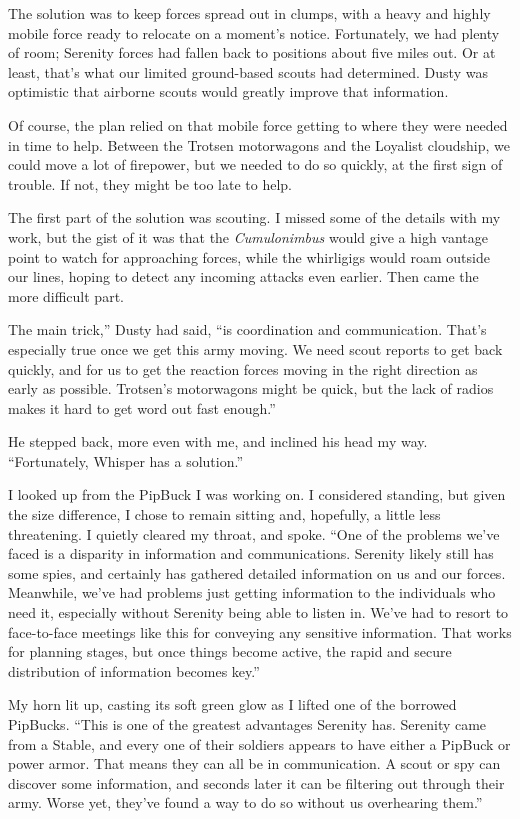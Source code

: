 The solution was to keep forces spread out in clumps, with a heavy and highly mobile force ready to relocate on a moment’s notice. Fortunately, we had plenty of room; Serenity forces had fallen back to positions about five miles out. Or at least, that’s what our limited ground-based scouts had determined. Dusty was optimistic that airborne scouts would greatly improve that information.

Of course, the plan relied on that mobile force getting to where they were needed in time to help. Between the Trotsen motorwagons and the Loyalist cloudship, we could move a lot of firepower, but we needed to do so quickly, at the first sign of trouble. If not, they might be too late to help.

The first part of the solution was scouting. I missed some of the details with my work, but the gist of it was that the \textit{Cumulonimbus} would give a high vantage point to watch for approaching forces, while the whirligigs would roam outside our lines, hoping to detect any incoming attacks even earlier. Then came the more difficult part.

\leavevmode{}The main trick,” Dusty had said, “is coordination and communication. That’s especially true once we get this army moving. We need scout reports to get back quickly, and for us to get the reaction forces moving in the right direction as early as possible. Trotsen’s motorwagons might be quick, but the lack of radios makes it hard to get word out fast enough.”

He stepped back, more even with me, and inclined his head my way. “Fortunately, Whisper has a solution.”

I looked up from the PipBuck I was working on. I considered standing, but given the size difference, I chose to remain sitting and, hopefully, a little less threatening. I quietly cleared my throat, and spoke. “One of the problems we’ve faced is a disparity in information and communications. Serenity likely still has some spies, and certainly has gathered detailed information on us and our forces. Meanwhile, we’ve had problems just getting information to the individuals who need it, especially without Serenity being able to listen in. We’ve had to resort to face-to-face meetings like this for conveying any sensitive information. That works for planning stages, but once things become active, the rapid and secure distribution of information becomes key.”

My horn lit up, casting its soft green glow as I lifted one of the borrowed PipBucks. “This is one of the greatest advantages Serenity has. Serenity came from a Stable, and every one of their soldiers appears to have either a PipBuck or power armor. That means they can all be in communication. A scout or spy can discover some information, and seconds later it can be filtering out through their army. Worse yet, they’ve found a way to do so without us overhearing them.”

